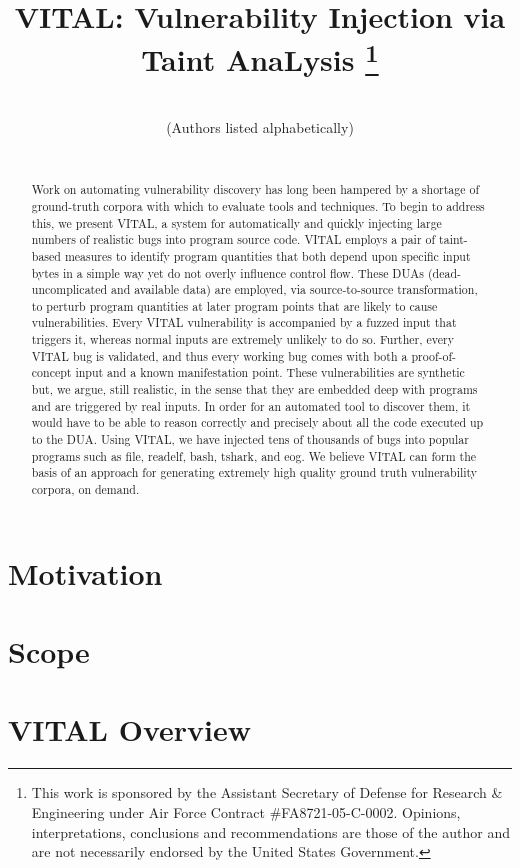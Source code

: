 \documentclass[conference]{IEEEtran}
\title{VITAL: Vulnerability Injection via Taint AnaLysis
  \thanks{This work is sponsored by the Assistant Secretary of Defense
    for Research \& Engineering under Air Force Contract
    \#FA8721-05-C-0002.  Opinions, interpretations, conclusions and
    recommendations are those of the author and are not necessarily
    endorsed by the United States Government.} }
\author{
\IEEEauthorblockN{Brendan Dolan-Gavitt\IEEEauthorrefmark{1}, Patrick Hulin\IEEEauthorrefmark{2}, Tim Leek\IEEEauthorrefmark{2}, Ryan Whelan\IEEEauthorrefmark{2}}
\\
\small (Authors listed alphabetically) \\
\\
\IEEEauthorblockA{\IEEEauthorrefmark{1}NYU\\brendandg@nyu.edu}
\IEEEauthorblockA{\IEEEauthorrefmark{2}MIT Lincoln Laboratory\\
\{patrick.hulin,tleek,rwhelan\}@ll.mit.edu}
}
\begin{document}
\maketitle

\begin{abstract}

Work on automating vulnerability discovery has long been hampered by a shortage of ground-truth corpora with which to evaluate tools and techniques.
To begin to address this, we present VITAL, a system for automatically and quickly injecting large numbers of realistic bugs into program source code.  
VITAL employs a pair of taint-based measures to identify program quantities that both depend upon specific input bytes in a simple way yet do not overly influence control flow.
These DUAs (dead-uncomplicated and available data) are employed, via source-to-source transformation, to perturb program quantities at later program points that are likely to cause vulnerabilities.
Every VITAL vulnerability is accompanied by a fuzzed input that triggers it, whereas normal inputs are extremely unlikely to do so.
Further, every VITAL bug is validated, and thus every working bug comes with both a proof-of-concept input and a known manifestation point.  
These vulnerabilities are synthetic but, we argue, still realistic, in the sense that they are embedded deep with programs and are triggered by real inputs.
In order for an automated tool to discover them, it would have to be able to reason correctly and precisely about all the code executed up to the DUA.
Using VITAL, we have injected tens of thousands of bugs into popular programs such as file, readelf, bash, tshark, and eog.
We believe VITAL can form the basis of an approach for generating extremely high quality ground truth vulnerability corpora, on demand.



\end{abstract}

\section{Motivation}
\label{sec:motivation}


\section{Scope}
\label{sec:scope}


\section{VITAL Overview}
\label{sec:overview}

\end{document}
